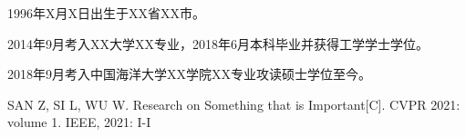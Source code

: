 \documentclass[
    Print       = false,
    Title       = 中国海洋大学硕博学位论文LaTeX模板,
    Author      = 作者,
    Advisor     = 指导教师,
    Thesis      = 全日制专业学位,
    Major       = 专业名称,
    Topic       = 研究方向,
    Year        = 2021,
    Month       = 5,
    Day         = 12,
    TitleEng    = {{LaTeX Template for Master's and Doctoral Dissertations of Ocean University of China}}
]{oucthesis}
\begin{document}
    \begin{profile}
        1996年X月X日出生于XX省XX市。

        2014年9月考入XX大学XX专业，2018年6月本科毕业并获得工学学士学位。

        2018年9月考入中国海洋大学XX学院XX专业攻读硕士学位至今。
    \end{profile}

    \begin{mypaper}
        \item SAN Z, SI L, WU W. Research on Something that is Important[C]. CVPR 2021: volume 1. IEEE, 2021: I-I
    \end{mypaper}

    \makebackcover
\end{document}

